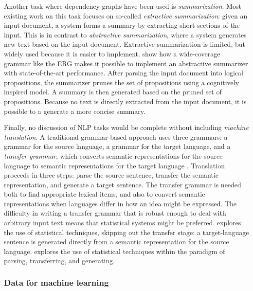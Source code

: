 \documentclass[output=paper,nonflat]{langsci/langscibook}
\begin{document}
Another task where dependency graphs have been used is \textit{summarization}.
Most existing work on this task focuses on so-called \textit{extractive summarization}:
given an input document, a system forms a summary by extracting short sections of the input.
This is in contrast to \textit{abstractive summarization},
where a system generates new text based on the input document.
Extractive summarization is limited, but widely used because it is easier to implement.
\citet{fang2016summarise} show how a wide-coverage grammar like the ERG
makes it possible to implement an abstractive summarizer with state-of-the-art performance.
After parsing the input document into logical propositions,
the summarizer prunes the set of propositions using a cognitively inspired model.
A summary is then generated based on the pruned set of propositions.
Because no text is directly extracted from the input document,
it is possible to a generate a more concise summary.

Finally, no discussion of NLP tasks would be complete without including \textit{machine translation}.
A traditional grammar-based approach uses three grammars:
a grammar for the source language,
a grammar for the target language,
and a \textit{transfer grammar}, which converts semantic representations for the source language
to semantic representations for the target language \citep{OVL2007a-u,bond2011deep}.
Translation proceeds in three steps:
parse the source sentence, transfer the semantic representation, and generate a target sentence.
The transfer grammar is needed both to find appropriate lexical items,
and also to convert semantic representations
when languages differ in how an idea might be expressed.
The difficulty in writing a transfer grammar
that is robust enough to deal with arbitrary input text
means that statistical systems might be preferred.
\citet{horvat2017translate} explores the use of statistical techniques,
skipping out the transfer stage:
a target-language sentence is generated directly
from a semantic representation for the source language.
\citet{goodman2018translate} explores the use of statistical techniques
within the paradigm of parsing, transferring, and generating.




\subsubsection{Data for machine learning}
\label{cl:downstream:data}
\end{document}
